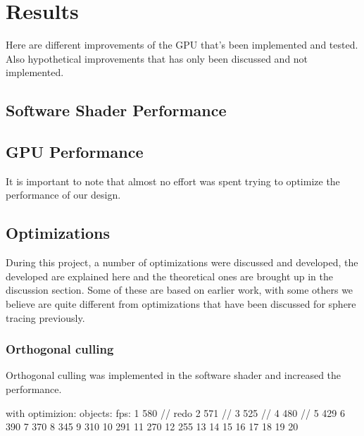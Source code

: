 \chapter{Results}

	Here are different improvements of the GPU that's been implemented and tested.
	Also hypothetical improvements that has only been discussed and not
	implemented.

	\section{Software Shader Performance}

	\section{GPU Performance}
		
		It is important to note that almost no effort was spent trying to
		optimize the performance of our design.

	\section{Optimizations}
		
		During this project, a number of optimizations were discussed and 
		developed, the developed are explained here and the theoretical ones
		are brought up in the discussion section. Some of these are based on earlier
		work, with some others we believe are quite different from optimizations
		that have been discussed for sphere tracing previously.

		\subsection{Orthogonal culling}
			Orthogonal culling was implemented in the software shader and increased 
			the performance.


			with optimizion:
			objects:	fps:
			1			580	// redo
			2			571	//
			3			525	//
			4			480 //
			5			429
			6			390
			7			370
			8			345
			9			310
			10			291
			11			270
			12			255
			13			
			14
			15
			16
			17
			18
			19
			20



		
		
		

